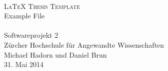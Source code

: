 
\begin{titlepage}
 	\mbox{}\vspace{5\baselineskip}\\
 	\sffamily\huge
 	\centering
 	\textsc{\LaTeX{} Thesis Template} \\[2ex]
    Example File
    \rmfamily\Large
    \vspace{1\baselineskip}\\
    \mbox{}
    \vspace{3\baselineskip}\\
 	\rmfamily\Large
 	Softwareprojekt 2 \\ Zürcher Hochschule für Angewandte Wissenschaften
 	\vspace{2\baselineskip}\\
 	\rmfamily\Large
 	Michael Hadorn und Daniel Brun
 	\vspace{1\baselineskip}\\
 	31. Mai 2014
\end{titlepage}